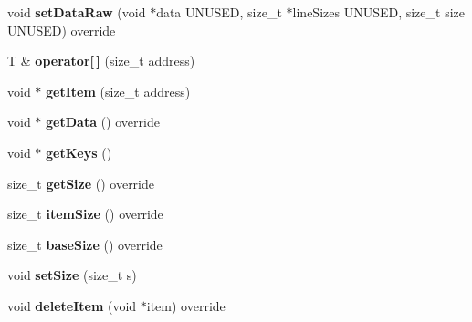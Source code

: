 \begin{DoxyCompactItemize}
\item 
\hypertarget{classfaster_1_1workerIFddCore_a4ef9b26a6d008c213b8fb0447aaed235}{}\label{classfaster_1_1workerIFddCore_a4ef9b26a6d008c213b8fb0447aaed235} 
void {\bfseries set\+Data\+Raw} (void $\ast$data U\+N\+U\+S\+ED, size\+\_\+t $\ast$line\+Sizes U\+N\+U\+S\+ED, size\+\_\+t size U\+N\+U\+S\+ED) override
\item 
\hypertarget{classfaster_1_1workerIFddCore_aa3daa4aedcb636a6f6340f6b5100a39d}{}\label{classfaster_1_1workerIFddCore_aa3daa4aedcb636a6f6340f6b5100a39d} 
T \& {\bfseries operator\mbox{[}$\,$\mbox{]}} (size\+\_\+t address)
\item 
\hypertarget{classfaster_1_1workerIFddCore_a500739e77cf51a8d4d1f33b3d0539979}{}\label{classfaster_1_1workerIFddCore_a500739e77cf51a8d4d1f33b3d0539979} 
void $\ast$ {\bfseries get\+Item} (size\+\_\+t address)
\item 
\hypertarget{classfaster_1_1workerIFddCore_acc21ea35f48404e016c43ae6288c921d}{}\label{classfaster_1_1workerIFddCore_acc21ea35f48404e016c43ae6288c921d} 
void $\ast$ {\bfseries get\+Data} () override
\item 
\hypertarget{classfaster_1_1workerIFddCore_ae42434b600030caf5bdacc1492e64092}{}\label{classfaster_1_1workerIFddCore_ae42434b600030caf5bdacc1492e64092} 
void $\ast$ {\bfseries get\+Keys} ()
\item 
\hypertarget{classfaster_1_1workerIFddCore_ad3d44ae7744b105c96f6edbc2c0246b4}{}\label{classfaster_1_1workerIFddCore_ad3d44ae7744b105c96f6edbc2c0246b4} 
size\+\_\+t {\bfseries get\+Size} () override
\item 
\hypertarget{classfaster_1_1workerIFddCore_a20f1bc0ed1ea0a2f63626d19d56ffb4c}{}\label{classfaster_1_1workerIFddCore_a20f1bc0ed1ea0a2f63626d19d56ffb4c} 
size\+\_\+t {\bfseries item\+Size} () override
\item 
\hypertarget{classfaster_1_1workerIFddCore_a6c73991bfdc0e93c08a79640e00e39b5}{}\label{classfaster_1_1workerIFddCore_a6c73991bfdc0e93c08a79640e00e39b5} 
size\+\_\+t {\bfseries base\+Size} () override
\item 
\hypertarget{classfaster_1_1workerIFddCore_af9fd709018ea26ff162843b4b3f2f9b1}{}\label{classfaster_1_1workerIFddCore_af9fd709018ea26ff162843b4b3f2f9b1} 
void {\bfseries set\+Size} (size\+\_\+t s)
\item 
\hypertarget{classfaster_1_1workerIFddCore_a1fa9b2111ed7dc167dad448d68397dcf}{}\label{classfaster_1_1workerIFddCore_a1fa9b2111ed7dc167dad448d68397dcf} 
void {\bfseries delete\+Item} (void $\ast$item) override
\item 

\end{DoxyCompactItemize}

